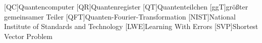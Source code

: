 \begin{acronym}
  [QC]{Quantencomputer}
  [QR]{Quantenregister}
  [QT]{Quantenteilchen}
  [ggT]{größter gemeinsamer Teiler}
  [QFT]{Quanten-Fourier-Transformation}
  [NIST]{National Institute of Standards and Technology}
  [LWE]{Learning With Errors}
  [SVP]{Shortest Vector Problem}
\end{acronym}